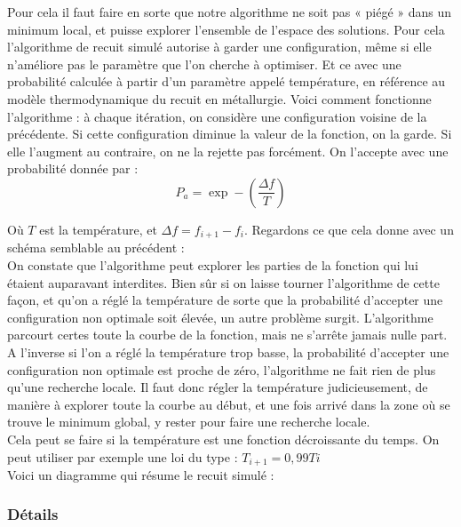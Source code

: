 \documentclass[11pt]{report}
\begin{document}
Pour cela il faut faire en sorte que notre algorithme ne soit pas « piégé » dans un minimum local, et puisse explorer l'ensemble de l'espace des solutions. Pour cela l'algorithme de recuit simulé autorise à garder une configuration, même si elle n'améliore pas le paramètre que l'on cherche à optimiser. Et ce avec une probabilité calculée à partir d'un paramètre appelé température, en référence au modèle thermodynamique du recuit en métallurgie. Voici comment fonctionne l'algorithme : à chaque itération, on considère une configuration voisine de la précédente. Si cette configuration diminue la valeur de la fonction, on la garde. Si elle l'augment au contraire, on ne la rejette pas forcément. On l'accepte avec une probabilité donnée par :\\

\begin{equation}
P_a = \exp -(\frac{\Delta f}{T}) 
\end{equation}



Où $T$ est la température, et $\Delta f = f_{i+1} - f_{i}$. Regardons ce que cela donne avec un schéma semblable au précédent : \\

On constate que l'algorithme peut explorer les parties de la fonction qui lui étaient auparavant interdites. Bien sûr si on laisse tourner l'algorithme de cette façon, et qu'on a réglé la température de sorte  que la probabilité d'accepter une configuration non optimale soit élevée, un autre problème surgit. L'algorithme parcourt certes toute la courbe de la fonction, mais ne s'arrête jamais nulle part. A l'inverse si l'on a réglé la température trop basse, la probabilité d'accepter une configuration non optimale est proche de zéro, l'algorithme ne fait rien de plus qu'une recherche locale. Il faut donc régler la température judicieusement, de manière à explorer toute la courbe au début, et une fois arrivé dans la zone où se trouve le minimum global, y rester pour faire une recherche locale. \\

Cela peut se faire si la température est une fonction décroissante du temps. On peut utiliser par exemple une loi du type : $ T_{i+1} = 0,99{Ti}$\\

Voici un diagramme qui résume le recuit simulé : \\

\subsubsection*{Détails}
\end{document}
